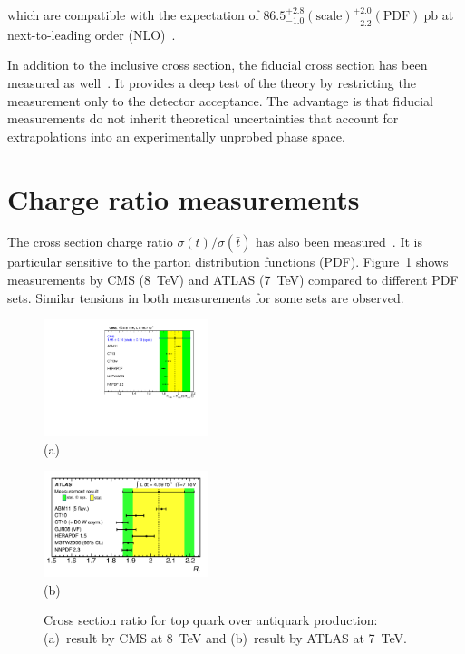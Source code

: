 \documentclass{PoS}
\begin{document}
which are compatible with the expectation of $86.5_{-1.0}^{+2.8}\mathrm{(scale)}_{-2.2}^{+2.0}\mathrm{(PDF)}~\mathrm{pb}$ at next-to-leading order (NLO)~\cite{Kidonakis-8tev}.

In addition to the inclusive cross section, the fiducial cross section has been measured as well~\cite{CMS-PAS-TOP-15-007,atlas-xsec8}. It provides a deep test of the theory by restricting the measurement only to the detector acceptance. The advantage is that fiducial measurements do not inherit theoretical uncertainties that account for extrapolations into an experimentally unprobed phase space.





\section{Charge ratio measurements}
The cross section charge ratio $\sigma(t)/\sigma(\bar{t})$ has also been measured~\cite{atlas-charge7,cms-xsec8}. It is particular sensitive to the parton distribution functions (PDF). Figure~\ref{fig:charge-ratio} shows measurements by CMS (8~TeV) and ATLAS (7~TeV) compared to different PDF sets. Similar tensions in both measurements for some sets are observed. 

\begin{figure}[htbp]
\begin{center}
\parbox[t]{0.45\textwidth}{\centering\includegraphics[width=0.43\textwidth]{cms_xsec8/charge.pdf}\\(a)}
\parbox[t]{0.45\textwidth}{\centering\includegraphics[width=0.43\textwidth]{atlas_charge7/charge.pdf}\\(b)}
\end{center}
\caption{\label{fig:charge-ratio}Cross section ratio for top quark over antiquark production: (a)~result by CMS at 8~TeV and (b)~result by ATLAS at 7~TeV.}

\end{figure}
\end{document}
